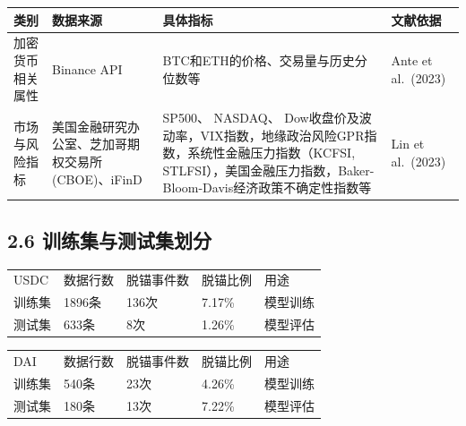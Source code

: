 \documentclass[
  letterpaper,
  DIV=11,
  numbers=noendperiod]{scrartcl}
\begin{document}
\begin{longtable}[]{@{}
  >{\raggedright\arraybackslash}p{}
  >{\raggedright\arraybackslash}p{}
  >{\raggedright\arraybackslash}p{}
  >{\raggedright\arraybackslash}p{}@{}}
\toprule\noalign{}
\begin{minipage}[b]{\linewidth}\raggedright
类别
\end{minipage} & \begin{minipage}[b]{\linewidth}\raggedright
数据来源
\end{minipage} & \begin{minipage}[b]{\linewidth}\raggedright
具体指标
\end{minipage} & \begin{minipage}[b]{\linewidth}\raggedright
文献依据
\end{minipage} \\
\midrule\noalign{}
\endhead
\bottomrule\noalign{}
\endlastfoot
加密货币相关属性 & Binance API & BTC和ETH的价格、交易量与历史分位数等 &
Ante et al.~(2023) \\
市场与风险指标 & 美国金融研究办公室、芝加哥期权交易所(CBOE)、iFinD &
SP500、 NASDAQ、
Dow收盘价及波动率，VIX指数，地缘政治风险GPR指数，系统性金融压力指数（KCFSI,
STLFSI），美国金融压力指数，Baker-Bloom-Davis经济政策不确定性指数等 &
Lin et al.~(2023) \\
\end{longtable}

\subsection{2.6
训练集与测试集划分}\label{ux8badux7ec3ux96c6ux4e0eux6d4bux8bd5ux96c6ux5212ux5206}

\begin{longtable}[]{@{}lllll@{}}
\toprule\noalign{}
\endhead
\bottomrule\noalign{}
\endlastfoot
USDC & 数据行数 & 脱锚事件数 & 脱锚比例 & 用途 \\
训练集 & 1896条 & 136次 & 7.17\% & 模型训练 \\
测试集 & 633条 & 8次 & 1.26\% & 模型评估 \\
\end{longtable}

\begin{longtable}[]{@{}lllll@{}}
\toprule\noalign{}
\endhead
\bottomrule\noalign{}
\endlastfoot
DAI & 数据行数 & 脱锚事件数 & 脱锚比例 & 用途 \\
训练集 & 540条 & 23次 & 4.26\% & 模型训练 \\
测试集 & 180条 & 13次 & 7.22\% & 模型评估 \\
\end{longtable}
\end{document}
